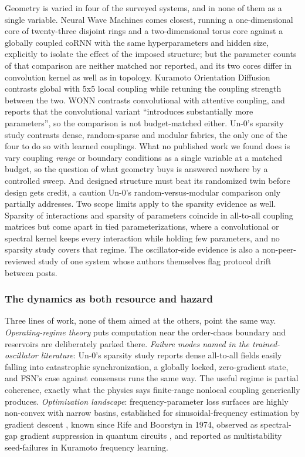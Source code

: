 \documentclass[10pt]{article}
\newcounter{none} %
\begin{document}
Geometry is varied in four of the surveyed systems, and in none of them
as a single variable. Neural Wave Machines \citep{keller2023} comes
closest, running a one-dimensional core of twenty-three disjoint rings
and a two-dimensional torus core against a globally coupled coRNN with
the same hyperparameters and hidden size, explicitly to isolate the
effect of the imposed structure; but the parameter counts of that
comparison are neither matched nor reported, and its two cores differ in
convolution kernel as well as in topology. Kuramoto Orientation
Diffusion contrasts global with 5x5 local coupling while retuning the
coupling strength between the two. WONN \citep{wonn} contrasts
convolutional with attentive coupling, and reports that the
convolutional variant ``introduces substantially more parameters'', so
the comparison is not budget-matched either. Un-0's sparsity study
contrasts dense, random-sparse and modular fabrics, the only one of the
four to do so with learned couplings. What no published work we found
does is vary coupling \emph{range} or boundary conditions as a single
variable at a matched budget, so the question of what geometry buys is
answered nowhere by a controlled sweep. And designed structure must beat
its randomized twin before design gets credit, a caution Un-0's
random-versus-modular comparison only partially addresses. Two scope
limits apply to the sparsity evidence as well. Sparsity of interactions
and sparsity of parameters coincide in all-to-all coupling matrices but
come apart in tied parameterizations, where a convolutional or spectral
kernel keeps every interaction while holding few parameters, and no
sparsity study covers that regime. The oscillator-side evidence is also
a non-peer-reviewed study of one system whose authors themselves flag
protocol drift between posts.

\subsubsection{The dynamics as both resource and
hazard}\label{sec-3-1-4}

Three lines of work, none of them aimed at the others, point the same
way. \emph{Operating-regime theory} puts computation near the
order-chaos boundary and reservoirs are deliberately parked there.
\emph{Failure modes named in the trained-oscillator literature}: Un-0's
sparsity study reports dense all-to-all fields easily falling into
catastrophic synchronization, a globally locked, zero-gradient state,
and FSN's case against consensus runs the same way. The useful regime is
partial coherence, exactly what the physics says finite-range nonlocal
coupling generically produces. \emph{Optimization landscape}:
frequency-parameter loss surfaces are highly non-convex with narrow
basins, established for sinusoidal-frequency estimation by gradient
descent \citep{hayes2023, turian2020}, known since Rife and Boorstyn in
1974, observed as spectral-gap gradient suppression in quantum circuits
\citep{poppel2026}, and reported as multistability seed-failures in
Kuramoto frequency learning.
\end{document}
